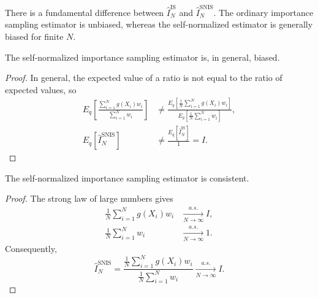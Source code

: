 There is a fundamental difference between $\hat{I}_N^{\mathrm{IS}}$ and $\hat{I}_N^{\mathrm{SNIS}}$. The ordinary importance sampling estimator is unbiased, whereas the self-normalized estimator is generally biased for finite $N$.
\begin{proposition}
    \label{prop:self_normalized_importance_sampling_biased}
    The self-normalized importance sampling estimator is, in general, biased.
\end{proposition}
\begin{proof}
    In general, the expected value of a ratio is not equal to the ratio of expected values, so
    \begin{align}
        E_q\left[\frac{\sum_{i=1}^{N}g(X_i)w_i}{\sum_{i=1}^{N}w_i}\right] &\neq \frac{E_q\left[\frac{1}{N} \sum_{i=1}^{N}g(X_i)w_i\right]}{E_q\left[\frac{1}{N} \sum_{i=1}^{N}w_i\right]}, \\
        E_q\left[\hat{I}_N^{\mathrm{SNIS}}\right] &\neq \frac{E_q\left[\hat{I}_N^{\mathrm{IS}}\right]}{1} = I.
    \end{align}
\end{proof}

\begin{proposition}
    \label{prop:self_normalized_importance_sampling_consistent}
    The self-normalized importance sampling estimator is consistent.
\end{proposition}
\begin{proof}
    The strong law of large numbers gives
    \begin{align}
        \frac{1}{N}\sum_{i=1}^{N} g(X_i)w_i &\xrightarrow[N\to\infty]{a.s.} I,\\
        \frac{1}{N}\sum_{i=1}^{N} w_i &\xrightarrow[N\to\infty]{a.s.} 1.
    \end{align}
    Consequently,
    \begin{equation}
        \hat{I}_N^{\mathrm{SNIS}} = \frac{\frac{1}{N}\sum_{i=1}^{N} g(X_i)w_i}{\frac{1}{N}\sum_{i=1}^{N} w_i} \xrightarrow[N\to\infty]{a.s.} I.
    \end{equation}
\end{proof}

